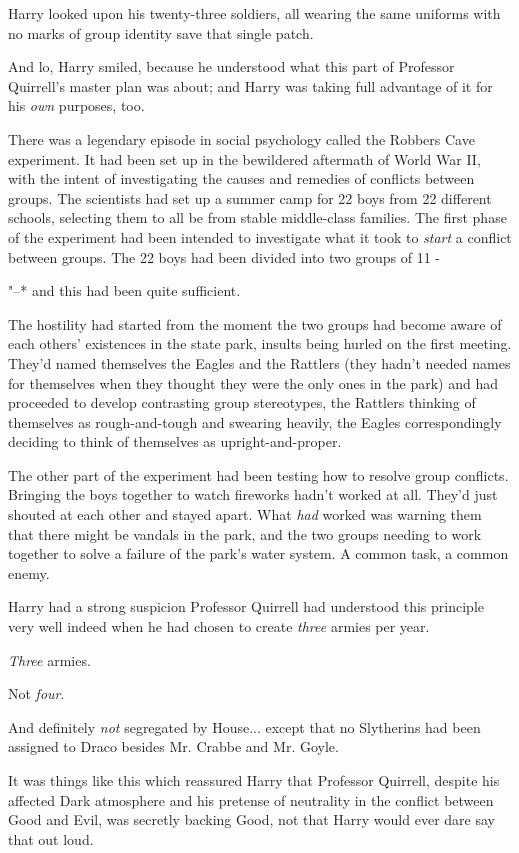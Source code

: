Harry looked upon his twenty-three soldiers, all wearing the same
uniforms with no marks of group identity save that single patch.

And lo, Harry smiled, because he understood what this part of Professor
Quirrell's master plan was about; and Harry was taking full advantage of
it for his \emph{own} purposes, too.

There was a legendary episode in social psychology called the Robbers
Cave experiment. It had been set up in the bewildered aftermath of World
War II, with the intent of investigating the causes and remedies of
conflicts between groups. The scientists had set up a summer camp for 22
boys from 22 different schools, selecting them to all be from stable
middle-class families. The first phase of the experiment had been
intended to investigate what it took to \emph{start} a conflict between
groups. The 22 boys had been divided into two groups of 11 -

"--* and this had been quite sufficient.

The hostility had started from the moment the two groups had become
aware of each others' existences in the state park, insults being hurled
on the first meeting. They'd named themselves the Eagles and the
Rattlers (they hadn't needed names for themselves when they thought they
were the only ones in the park) and had proceeded to develop contrasting
group stereotypes, the Rattlers thinking of themselves as
rough-and-tough and swearing heavily, the Eagles correspondingly
deciding to think of themselves as upright-and-proper.

The other part of the experiment had been testing how to resolve group
conflicts. Bringing the boys together to watch fireworks hadn't worked
at all. They'd just shouted at each other and stayed apart. What
\emph{had} worked was warning them that there might be vandals in the
park, and the two groups needing to work together to solve a failure of
the park's water system. A common task, a common enemy.

Harry had a strong suspicion Professor Quirrell had understood this
principle very well indeed when he had chosen to create \emph{three}
armies per year.

\emph{Three} armies.

Not \emph{four}.

And definitely \emph{not} segregated by House... except that no
Slytherins had been assigned to Draco besides Mr. Crabbe and Mr. Goyle.

It was things like this which reassured Harry that Professor Quirrell,
despite his affected Dark atmosphere and his pretense of neutrality in
the conflict between Good and Evil, was secretly backing Good, not that
Harry would ever dare say that out loud.

